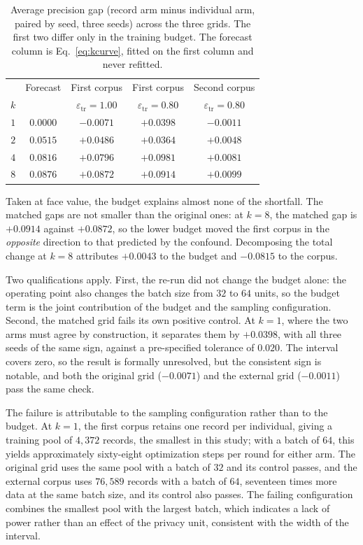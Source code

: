\begin{table}[!t]
\centering
\caption{Average precision gap (record arm minus individual arm, paired by
seed, three seeds) across the three grids. The first two differ only in the
training budget. The forecast column is Eq.~\eqref{eq:kcurve}, fitted on the
first column and never refitted.}
\label{tab:kscaling_matched}
\setlength{\tabcolsep}{3.5pt}
\begin{tabular}{ccccc}
\toprule
 & Forecast & First corpus & First corpus & Second corpus \\
$k$ & & $\varepsilon_{\mathrm{tr}}\!=\!1.00$ & $\varepsilon_{\mathrm{tr}}\!=\!0.80$ & $\varepsilon_{\mathrm{tr}}\!=\!0.80$ \\
\midrule
$1$ & $0.0000$ & $-0.0071$ & $+0.0398$ & $-0.0011$ \\
$2$ & $0.0515$ & $+0.0486$ & $+0.0364$ & $+0.0048$ \\
$4$ & $0.0816$ & $+0.0796$ & $+0.0981$ & $+0.0081$ \\
$8$ & $0.0876$ & $+0.0872$ & $+0.0914$ & $+0.0099$ \\
\bottomrule
\end{tabular}
\end{table}

Taken at face value, the budget explains almost none of the shortfall. The
matched gaps are not smaller than the original ones: at $k = 8$, the matched gap
is $+0.0914$ against $+0.0872$, so the lower budget moved the first corpus in
the \emph{opposite} direction to that predicted by the confound. Decomposing the
total change at $k = 8$ attributes $+0.0043$ to the budget and $-0.0815$ to the
corpus.

Two qualifications apply. First, the re-run did not change the budget alone:
the operating point also changes the batch size from $32$ to $64$ units, so the
budget term is the joint contribution of the budget and the sampling
configuration. Second, the matched grid fails its own positive control. At
$k = 1$, where the two arms must agree by construction, it separates them by
$+0.0398$, with all three seeds of the same sign, against a pre-specified
tolerance of $0.020$. The interval covers zero, so the result is formally
unresolved, but the consistent sign is notable, and both the original grid
($-0.0071$) and the external grid ($-0.0011$) pass the same check.

The failure is attributable to the sampling configuration rather than to the
budget. At $k = 1$, the first corpus retains one record per individual, giving
a training pool of $4{,}372$ records, the smallest in this study; with a batch
of $64$, this yields approximately sixty-eight optimization steps per round for
either arm. The original grid uses the same pool with a batch of $32$ and its
control passes, and the external corpus uses $76{,}589$ records with a batch of
$64$, seventeen times more data at the same batch size, and its control also
passes. The failing configuration combines the smallest pool with the largest
batch, which indicates a lack of power rather than an effect of the privacy
unit, consistent with the width of the interval.

